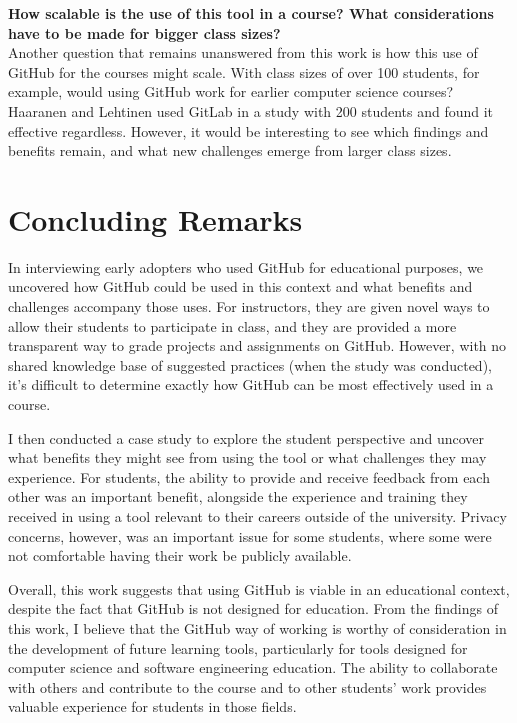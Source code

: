 \textbf{How scalable is the use of this tool in a course? What considerations have to be made for bigger class sizes?} \\
Another question that remains unanswered from this work is how this use of GitHub for the courses might scale. With class sizes of over 100 students, for example, would using GitHub work for earlier computer science courses? Haaranen and Lehtinen \cite{haaranen2015teaching} used GitLab in a study with 200 students and found it effective regardless. However, it would be interesting to see which findings and benefits remain, and what new challenges emerge from larger class sizes.

\section{Concluding Remarks}
In interviewing early adopters who used GitHub for educational purposes, we uncovered how GitHub could be used in this context and what benefits and challenges accompany those uses. For instructors, they are given novel ways to allow their students to participate in class, and they are provided a more transparent way to grade projects and assignments on GitHub. However, with no shared knowledge base of suggested practices (when the study was conducted), it's difficult to determine exactly how GitHub can be most effectively used in a course.

I then conducted a case study to explore the student perspective and uncover what benefits they might see from using the tool or what challenges they may experience. For students, the ability to provide and receive feedback from each other was an important benefit, alongside the experience and training they received in using a tool relevant to their careers outside of the university. Privacy concerns, however, was an important issue for some students, where some were not comfortable having their work be publicly available.

Overall, this work suggests that using GitHub is viable in an educational context, despite the fact that GitHub is not designed for education. From the findings of this work, I believe that the GitHub way of working is worthy of consideration in the development of future learning tools, particularly for tools designed for computer science and software engineering education. The ability to collaborate with others and contribute to the course and to other students' work provides valuable experience for students in those fields.
